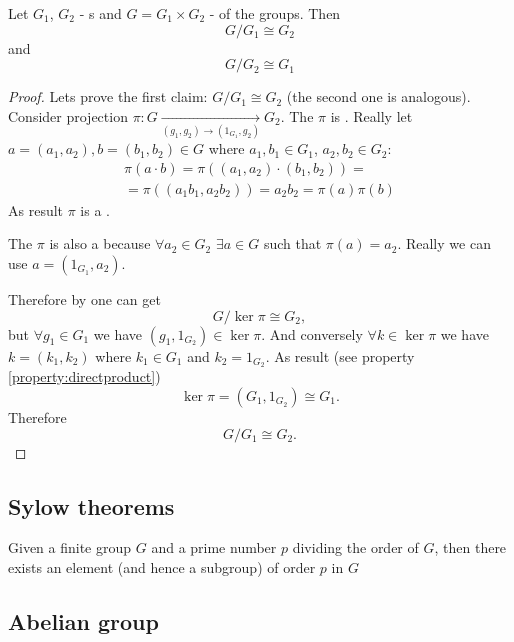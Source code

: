 \begin{appendices}
\begin{property}
  Let $G_1$, $G_2$ - s and $G = G_1 \times G_2$ -
   of the groups.
  Then
  \[
  G/G_1 \cong G_2
  \]
  and
  \[
  G/G_2 \cong G_1
  \]
  \label{property:directproductquotient}
  \begin{proof}
    Lets prove the first claim:
    $G/G_1 \cong G_2$ (the second one is analogous).
    Consider projection
    $\pi: G \xrightarrow[(g_1, g_2) \to (1_{G_1}, g_2)]{} G_2$. The
    $\pi$ is . Really
    let $a = (a_1, a_2), b = (b_1, b_2) \in G$ where
    $a_{1}, b_1 \in G_1$, $a_2, b_{2} \in G_2$:
    \begin{eqnarray}
      \pi\left(a \cdot b\right) = \pi\left(
      (a_1, a_2) \cdot (b_1, b_2)
      \right) =
      \nonumber \\
      = \pi\left(
      (a_1 b_1, a_2 b_2)
      \right) = a_2 b_2 =
      \pi\left(a\right) \pi\left(b\right)
      \nonumber
    \end{eqnarray}
    As result $\pi$ is a .
    
    The $\pi$ is also a  because $\forall a_2
    \in G_2$ $\exists a \in G$ such that $\pi(a) = a_2$. Really we can
    use $a = (1_{G_1}, a_2)$.
    
    Therefore by  one can get
    \[
    G/\ker{\pi} \cong G_2,
    \]
    but $\forall g_1 \in G_1$ we have $(g_1, 1_{G_2}) \in \ker{\pi}$.
    And conversely $\forall k \in \ker \pi$ we have $k = (k_1, k_2)$
    where $k_1 \in G_1$ and $k_2 = 1_{G_2}$.
    As result (see property \ref{property:directproduct})
    \[
    \ker \pi = \left(G_1, 1_{G_2}\right) \cong G_1.
    \]
    Therefore
    \[
    G/G_1 \cong G_2.
    \]
  \end{proof}
\end{property}

\subsection{Sylow theorems}

\begin{corollary}[Sylow]
  Given a finite group $G$ and a prime number $p$ dividing the order of $G$,
  then there exists an element (and hence a subgroup) of order $p$ in
  $G$ \cite{wiki:sylow}
  \label{cor:sylow}
\end{corollary}

\subsection{Abelian group}


\end{appendices}
